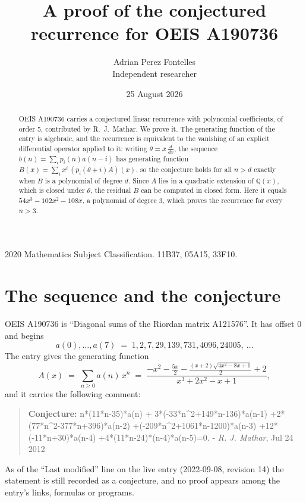 \documentclass[11pt,a4paper]{article}
\title{A proof of the conjectured recurrence for OEIS A190736}
\author{Adrian Perez Fontelles\\ \small Independent researcher}
\date{25 August 2026}
\theoremstyle{plain}
\theoremstyle{definition}
\begin{document}
\maketitle

\begin{abstract}
OEIS A190736 carries a conjectured linear recurrence with polynomial coefficients, of
order 5, contributed by R.~J.~Mathar. We prove it. The generating function of the
entry is algebraic, and the recurrence is equivalent to the vanishing of an explicit
differential operator applied to it: writing $\theta=x\,\frac{d}{dx}$, the sequence
$b(n)=\sum_{i}p_{i}(n)a(n-i)$ has generating function
$B(x)=\sum_{i}x^{i}\,(p_{i}(\theta+i)A)(x)$, so the conjecture holds for all $n>d$ exactly
when $B$ is a polynomial of degree $d$. Since $A$ lies in a quadratic extension of
$\mathbb{Q}(x)$, which is closed under $\theta$, the residual $B$ can be computed in
closed form. Here it equals $54 x^{3} - 102 x^{2} - 108 x$, a polynomial of degree $3$, which proves
the recurrence for every $n>3$.
\end{abstract}

\noindent\small 2020 Mathematics Subject Classification. 11B37, 05A15, 33F10.\normalsize

\section{The sequence and the conjecture}

OEIS A190736 is ``Diagonal sums of the Riordan matrix A121576''. It has offset $0$ and begins
\[
a(0),\dots,a(7)\;=\;1, 2, 7, 29, 139, 731, 4096, 24005,\ \dots
\]
The entry gives the generating function
\begin{equation}\label{eq:gf}
A(x)\;=\;\sum_{n\ge 0} a(n)\,x^{n}\;=\;\frac{- x^{2} - \frac{5 x}{2} - \frac{\left(x + 2\right) \sqrt{4 x^{2} - 8 x + 1}}{2} + 2}{x^{3} + 2 x^{2} - x + 1} ,
\end{equation}
and it carries the following comment:
\begin{quote}\small
\textbf{Conjecture:} n*(11*n-35)*a(n) + 3*(-33*n\^{}2+149*n-136)*a(n-1) +2*(77*n\^{}2-377*n+396)*a(n-2) +(-209*n\^{}2+1061*n-1200)*a(n-3) +12*(-11*n+30)*a(n-4) +4*(11*n-24)*(n-4)*a(n-5)=0. - \emph{R. J. Mathar}, Jul 24 2012
\end{quote}
As of the ``Last modified'' line on the live entry (2022-09-08, revision 14) the
statement is still recorded as a conjecture, and no proof appears among the entry's links,
formulas or programs.
\end{document}
